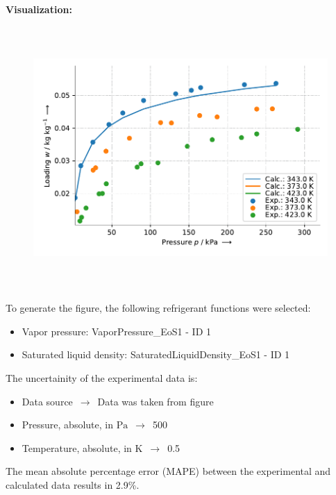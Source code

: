 \textbf{Visualization:}
%
\begin{figure}[!htp]
{\noindent\includegraphics[height=10cm, keepaspectratio]{figs/ads/ads_Propane_carbon_molecular_sieve_4A_DubininAstakhov_1.pdf}}
\end{figure}
%

To generate the figure, the following refrigerant functions were selected:
\begin{itemize}
\item Vapor pressure: VaporPressure\_EoS1 - ID 1
\item Saturated liquid density: SaturatedLiquidDensity\_EoS1 - ID 1
\end{itemize}

The uncertainity of the experimental data is:
\begin{itemize}
\item Data source $\,\to\,$ Data was taken from figure
\item Pressure, absolute, in $\si{\pascal}$ $\,\to\,$ 500
\item Temperature, absolute, in $\si{\kelvin}$ $\,\to\,$ 0.5
\end{itemize}

The mean absolute percentage error (MAPE) between the experimental and calculated data results in 2.9\%.
\FloatBarrier
\newpage
